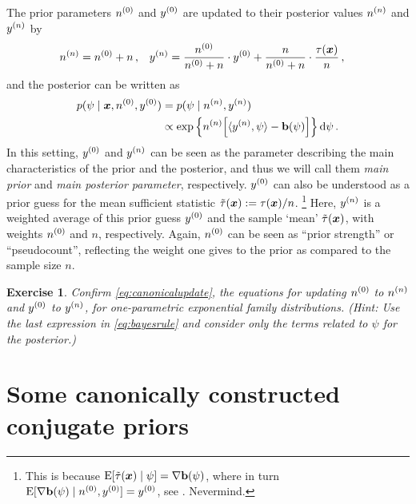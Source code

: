 \documentclass[12pt,a4paper	,twoside]{article}
\newcommand{\dd}{\,\mathrm{d}}
\newcommand{\mbf}[1]{\mathbf{#1}}
\newcommand{\bs}[1]{\boldsymbol{#1}}
\renewcommand{\vec}[1]{{\bs#1}}
\newcommand{\E}{\operatorname{E}}
\newtheorem{myex}{Exercise}
\begin{document}
The prior parameters $n^{(0)}$ and $y^{(0)}$ are updated to their posterior values $n^{(n)}$ and $y^{(n)}$ by
\begin{align}\label{eq:canonicalupdate}
\nn &= \nz + n\,, &
\yn &= \frac{\nz}{\nz + n} \cdot \yz + \frac{n}{\nz + n} \cdot \frac{\tau(\vec{x})}{n}\,,
\end{align}
and the posterior can be written as
\begin{align}\label{eq:canonicalposterior}
p(\psi \mid \vec{x}, \nz, \yz)
 &= p(\psi \mid \nn, \yn) \nonumber\\
 &\propto \exp\Big\{ \nn \Big[ \langle \yn, \psi \rangle - \mbf{b}(\psi) \Big] \Big\} \dd\psi\,.
\end{align}
In this setting, $y^{(0)}$ and $y^{(n)}$ can be seen as the parameter describing the main characteristics of the prior and the posterior,
and thus we will call them \emph{main prior} and \emph{main posterior parameter}, respectively.
$y^{(0)}$ can also be understood as a prior guess for the mean sufficient statistic $\ttau(\vec{x}) := \tau(\vec{x})/n$.%
\footnote{This is because $\E[\ttau(\vec{x}) \mid \psi] = \nabla\mbf{b}(\psi)$,
where in turn $\E[\nabla\mbf{b}(\psi) \mid \nz, \yz] = \yz$, see \textcite[Prop.~5.7, p.~275]{2000:bernardosmith}.
Nevermind.}
Here, $y^{(n)}$ is a weighted average of this prior guess $y^{(0)}$ and the sample `mean' $\ttau(\vec{x})$,
with weights $n^{(0)}$ and $n$, respectively.
Again, $n^{(0)}$ can be seen as ``prior strength'' or ``pseudocount'',
reflecting the weight one gives to the prior as compared to the sample size $n$.

\begin{myex}
Confirm \eqref{eq:canonicalupdate},
the equations for updating $n^{(0)}$ to $n^{(n)}$ and $y^{(0)}$ to $y^{(n)}$,
for one-parametric exponential family distributions.
(Hint: Use the last expression in \eqref{eq:bayesrule}
and consider only the terms related to $\psi$ for the posterior.)
\end{myex}


\section{Some canonically constructed conjugate priors}
\end{document}
